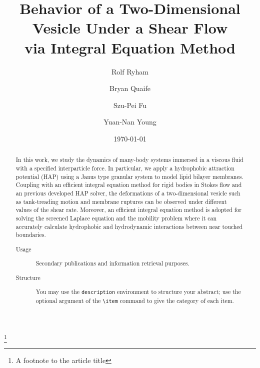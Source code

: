 \documentclass[%
 reprint,
 amsmath,amssymb,
 aps,
]{revtex4-2}
\begin{document}

\title{Behavior of a Two-Dimensional Vesicle Under a Shear Flow \\via Integral Equation Method}
\thanks{A footnote to the article title}%

\author{Rolf Ryham}
\author{Bryan Quaife}%
%


\author{Szu-Pei Fu}
\author{Yuan-Nan Young}
%


\date{\today}%

\begin{abstract}
In this work, we study the dynamics of many-body systems immersed in a viscous fluid with a specified interparticle force. In particular, we apply a hydrophobic attraction potential (HAP) using a Janus type granular system to model lipid bilayer membranes. Coupling with an efficient integral equation method for rigid bodies in Stokes flow and an previous developed HAP solver, the deformations of a two-dimensional vesicle such as tank-treading motion and membrane ruptures can be observed under different values of the shear rate. Moreover, an efficient integral equation method is adopted for solving the screened Laplace equation and the mobility problem where it can accurately calculate hydrophobic and hydrodynamic interactions between near touched boundaries.
\begin{description}
\item[Usage]
Secondary publications and information retrieval purposes.
\item[Structure]
You may use the \texttt{description} environment to structure your abstract;
use the optional argument of the \verb+\item+ command to give the category of each item. 
\end{description}
\end{abstract}
\end{document}
